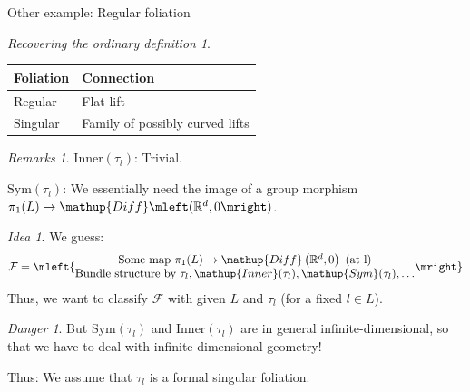 \documentclass[
aspectratio=3218, 
10pt
]{beamer}
\def\bes{\begin{equation*}}
\def\ees{\end{equation*}}
\theoremstyle{plain}
\theoremstyle{remark}
\newtheorem*{remark}{Remarks}
\newtheorem*{idea}{Idea}
\newtheorem*{danger}{Danger}
\newtheorem*{BackToTheRoots}{Recovering the ordinary definition}
\begin{document}
{

\begin{frame}{Other example: Regular foliation}
\begin{figure}
\end{figure}

\begin{BackToTheRoots}
	\centering
		\begin{tabular}{l|l}
			Foliation & Connection \\ \hline
			Regular & Flat lift \\
			Singular & Family of possibly curved lifts
		\end{tabular}
\end{BackToTheRoots}

\begin{remark}
$\mathup{Inner}(\tau_l)$: Trivial.

$\mathup{Sym}(\tau_l)$: We essentially need the image of a group morphism $\pi_1(L) \to \mathup{Diff}\mleft( \mathbb{R}^d, 0 \mright)$.
\end{remark}
\end{frame}

\begin{frame}
\begin{idea}
	We guess:
	\bes
		\mathcal{F}
		=
		\mleft\{
			\begin{matrix}
				\text{Some map } \pi_1(L) \to \mathup{Diff}\left( \mathbb{R}^d, 0 \right) \text{ (at l)}
				\\
				\text{Bundle structure by } \tau_l, \mathup{Inner}(\tau_l), \mathup{Sym}(\tau_l), \dots
			\end{matrix}
		\mright\}
	\ees
	Thus, we want to classify $\mathcal{F}$ with given $L$ and $\tau_l$ (for a fixed $l \in L$).
\end{idea}

\pause

\begin{danger}
But $\mathup{Sym}(\tau_l)$ and $\mathup{Inner}(\tau_l)$ are in general infinite-dimensional, so that we have to deal with infinite-dimensional geometry!

Thus: We assume that $\tau_l$ is a formal singular foliation.
\end{danger}
\end{frame}

}
\end{document}
